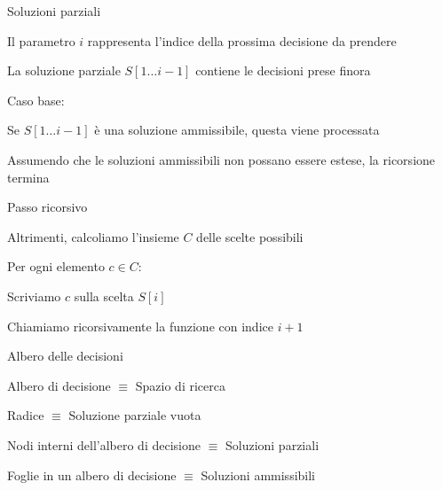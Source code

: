 \begin{frame}{Soluzioni parziali}

\BIL
\item Il parametro $i$ rappresenta l'indice della prossima decisione da prendere
\item La soluzione parziale $S[1 \ldots i-1]$ contiene le decisioni prese finora
\item \alert{Caso base}: 
  \BI
  \item Se $S[1 \ldots i-1]$ è una soluzione ammissibile, questa   viene processata
  \item Assumendo che le soluzioni ammissibili non possano essere estese, la ricorsione termina 
  \EI
\item \alert{Passo ricorsivo}  
  \BI
  \item Altrimenti, calcoliamo l'insieme $C$ delle scelte possibili 
  \item Per ogni elemento $c \in C$:
    \BI
    \item Scriviamo $c$ sulla scelta $S[i]$
    \item Chiamiamo ricorsivamente la funzione con indice $i+1$
    \EI
  \EI
\EIL

\end{frame}

\begin{frame}{Albero delle decisioni}

\BI
\item \alert{Albero di decisione} $\equiv$ Spazio di ricerca
\item \alert{Radice} $\equiv$ Soluzione parziale vuota
\item \alert{Nodi interni dell'albero di decisione} $\equiv$ Soluzioni parziali  
\item \alert{Foglie in un albero di decisione} $\equiv$ Soluzioni ammissibili 
\EI

\medskip
\begin{overprint}
\centerline{}
\centerline{}
\centerline{}
\centerline{}
\centerline{}
\centerline{}
\centerline{}
\centerline{}
\centerline{}
\centerline{}
\end{overprint}

\end{frame}


